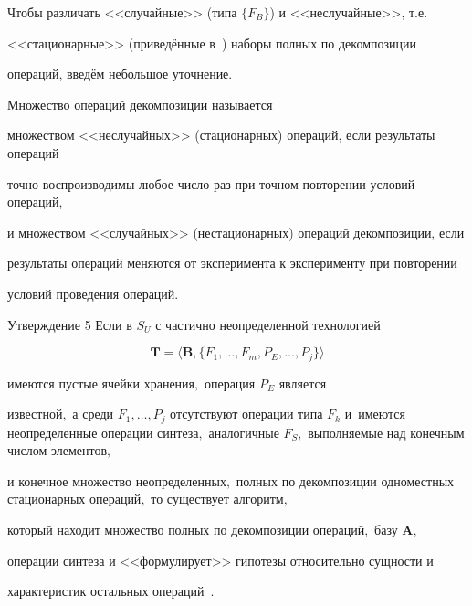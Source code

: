 Чтобы различать <<случайные>> (типа $\{F_{B}\}$) и <<неслучайные>>, т.е.

<<стационарные>> (приведённые в~\cite{krylov:bib18}) наборы полных по декомпозиции

операций, введём небольшое уточнение.



\smallskip



\begin{definition}[7]Множество операций декомпозиции называется

множеством <<неслучайных>> (стационарных) операций, если результаты операций

точно воспроизводимы любое число раз при точном повторении условий операций,

и множеством <<случайных>> (нестационарных) операций декомпозиции, если

результаты операций меняются от эксперимента к эксперименту при повторении

условий проведения операций.

\end{definition}



\smallskip



\hypertarget{kr:utv5}{}



\begin{newthm}{Утверждение 5} Если в $S_{U}$ с частично неопределенной технологией

$$\mathbf{T} =\langle \mathbf{B}, \{F_{1},\ldots, F_{m}, P_{E}, \ldots,

P_{j}\}\rangle $$ 

имеются пустые ячейки хранения$,$ операция $P_{E}$ является

известной$,$ а среди $F_{1},\ldots, P_{j}$ отсутствуют операции типа $F_{k}$ и~имеются неопределенные операции синтеза$,$ аналогичные $F_{S},$ выполняемые над конечным числом эле\-мен\-тов$,$ 

и конечное множество неопределенных$,$ полных по декомпозиции одноместных стационарных операций$,$ то существует алгоритм$,$

который находит множество полных по декомпозиции операций$,$ базу $\mathbf{A},$

операции синтеза и <<формулирует>> гипотезы относительно сущности и

характеристик остальных операций~\rm\cite{krylov:bib3}.

\end{newthm}



